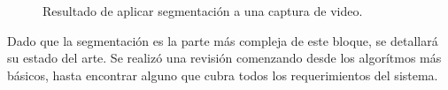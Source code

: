 \begin{figure}[H]
        \centering
        \hspace{2 mm}
  \caption{Resultado de aplicar segmentación a una captura de video.}
      \label{ejemploabelEstart}
\end{figure}

Dado que la segmentación es la parte más compleja de este bloque, se detallará su estado del arte. Se realizó una revisión comenzando desde los algorítmos más básicos, hasta encontrar alguno que cubra todos los requerimientos del sistema.

